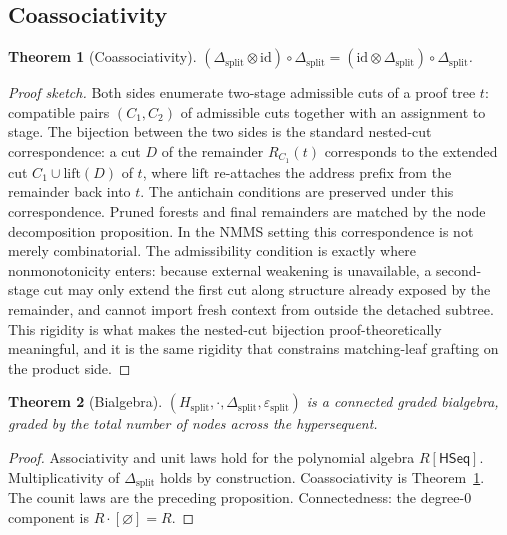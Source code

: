 \documentclass[11pt]{article}
\newtheorem{theorem}{Theorem}
\begin{document}
\subsection{Coassociativity}

\begin{theorem}[Coassociativity]\label{thm:coassoc}
$(\Delta_{\mathrm{split}}\otimes\mathrm{id})\circ\Delta_{\mathrm{split}} = (\mathrm{id}\otimes\Delta_{\mathrm{split}})\circ\Delta_{\mathrm{split}}$.
\end{theorem}

\begin{proof}[Proof sketch]
Both sides enumerate two-stage admissible cuts of a proof tree $t$: compatible pairs $(C_1,C_2)$ of admissible cuts together with an assignment to stage.  The bijection between the two sides is the standard nested-cut correspondence: a cut $D$ of the remainder $R_{C_1}(t)$ corresponds to the extended cut $C_1\cup\mathrm{lift}(D)$ of $t$, where $\mathrm{lift}$ re-attaches the address prefix from the remainder back into $t$.  The antichain conditions are preserved under this correspondence.  Pruned forests and final remainders are matched by the node decomposition proposition.
In the NMMS setting this correspondence is not merely combinatorial.  The admissibility condition is exactly where nonmonotonicity enters: because external weakening is unavailable, a second-stage cut may only extend the first cut along structure already exposed by the remainder, and cannot import fresh context from outside the detached subtree.  This rigidity is what makes the nested-cut bijection proof-theoretically meaningful, and it is the same rigidity that constrains matching-leaf grafting on the product side.
\end{proof}

\begin{theorem}[Bialgebra]\label{thm:bialgebra}
$(H_{\mathrm{split}},\cdot,\Delta_{\mathrm{split}},\varepsilon_{\mathrm{split}})$ is a connected graded bialgebra, graded by the total number of nodes across the hypersequent.
\end{theorem}

\begin{proof}
Associativity and unit laws hold for the polynomial algebra $R[\mathsf{HSeq}]$.  Multiplicativity of $\Delta_{\mathrm{split}}$ holds by construction.  Coassociativity is Theorem~\ref{thm:coassoc}.  The counit laws are the preceding proposition.  Connectedness: the degree-$0$ component is $R\cdot[\varnothing]=R$.
\end{proof}
\end{document}
